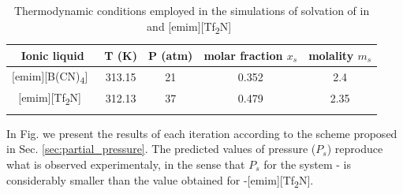 \documentclass[3p,twocolumn]{elsarticle}
\begin{document}
\begin{table}
\centering
\begin{threeparttable}
\caption{Thermodynamic conditions employed in the simulations of solvation of  in \ce{[emim][B(CN)_4]} and [emim][Tf\textsubscript{2}N]~\cite{Makino_2014,Schilderman_2007}}
\begin{tabular}{ c  c  c  c  c  }  
\toprule
Ionic liquid & T (K)  & P (atm)  & molar fraction $x_s$ & molality $m_s$ \\
\midrule		
$\text{[emim]}$[B(CN)\textsubscript{4}]~\cite{Koller_2012} & 313.15 & 21 & 0.352 & 2.4  \\
$\text{[emim]}$[Tf\textsubscript{2}N]~\cite{K_ddermann_2007}  & 312.13 & 37 & 0.479 & 2.35  \\
 \bottomrule
\label{table:solv} 
\end{tabular}
\end{threeparttable}
\end{table}

In Fig. we present the results of each iteration according to the scheme proposed in Sec. \ref{sec:partial_pressure}. The predicted values of pressure ($P_s$) reproduce what is observed experimentaly, in the sense that $P_s$ for the system -\ce{[emim][B(CN)_4]} is considerably smaller than the value obtained for -[emim][Tf\textsubscript{2}N].%
\end{document}
